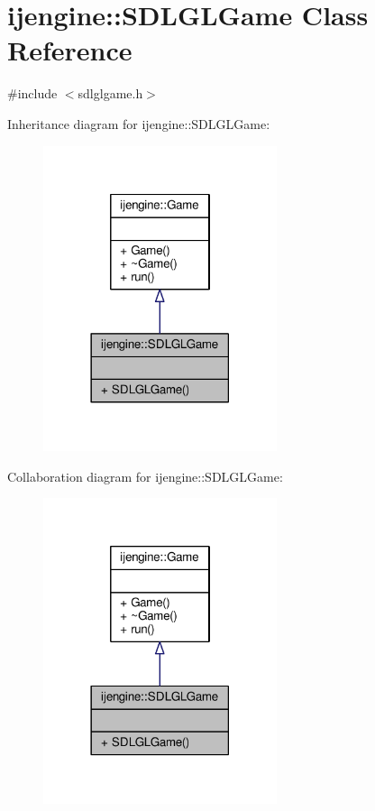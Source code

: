 \hypertarget{classijengine_1_1SDLGLGame}{\section{ijengine\-:\-:S\-D\-L\-G\-L\-Game Class Reference}
\label{classijengine_1_1SDLGLGame}
}


{\ttfamily \#include $<$sdlglgame.\-h$>$}



Inheritance diagram for ijengine\-:\-:S\-D\-L\-G\-L\-Game\-:\nopagebreak
\begin{figure}[H]
\begin{center}
\leavevmode
\includegraphics[width=194pt]{classijengine_1_1SDLGLGame__inherit__graph}
\end{center}
\end{figure}


Collaboration diagram for ijengine\-:\-:S\-D\-L\-G\-L\-Game\-:\nopagebreak
\begin{figure}[H]
\begin{center}
\leavevmode
\includegraphics[width=194pt]{classijengine_1_1SDLGLGame__coll__graph}
\end{center}
\end{figure}

